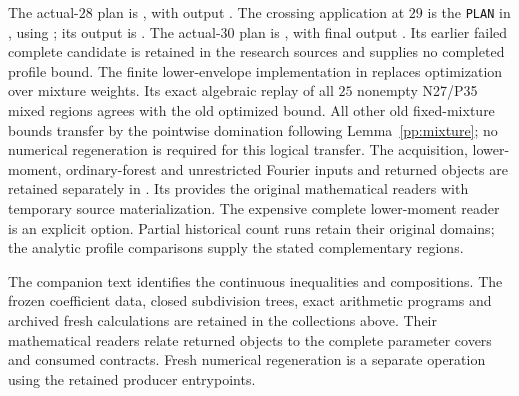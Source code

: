 The actual-$28$ plan is
, with output
.
The crossing application at $29$ is the \texttt{PLAN} in
, using
; its output is
.
The actual-$30$ plan is
, with final output
.
Its earlier failed complete candidate is retained in the research
sources and supplies no completed profile bound.
The finite lower-envelope implementation in
 replaces optimization
over mixture weights. Its exact algebraic replay of all $25$ nonempty
N27/P35 mixed regions agrees with the old optimized bound. All other
old fixed-mixture bounds transfer by the pointwise domination following
Lemma~\ref{pp:mixture}; no numerical regeneration is required for this
logical transfer.
The acquisition, lower-moment, ordinary-forest and unrestricted
Fourier inputs and returned objects are retained separately in
. Its
 provides the original mathematical
readers with temporary source materialization. The expensive complete
lower-moment reader is an explicit option. Partial historical count
runs retain their original domains; the analytic profile comparisons
supply the stated complementary regions.

The companion text identifies the continuous inequalities and compositions.
The frozen coefficient data, closed subdivision trees, exact arithmetic
programs and archived fresh calculations are retained in the collections
above. Their mathematical readers relate returned objects to the complete
parameter covers and consumed contracts. Fresh numerical regeneration
is a separate operation using the retained producer entrypoints.
